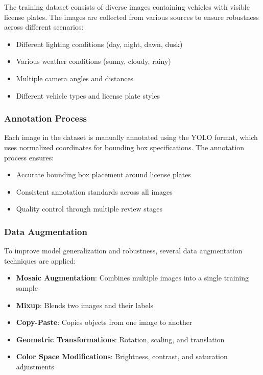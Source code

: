 \documentclass[12pt,a4paper]{article}
\begin{document}
The training dataset consists of diverse images containing vehicles with visible license plates. The images are collected from various sources to ensure robustness across different scenarios:

\begin{itemize}
    \item Different lighting conditions (day, night, dawn, dusk)
    \item Various weather conditions (sunny, cloudy, rainy)
    \item Multiple camera angles and distances
    \item Different vehicle types and license plate styles
\end{itemize}

\subsubsection{Annotation Process}

Each image in the dataset is manually annotated using the YOLO format, which uses normalized coordinates for bounding box specifications. The annotation process ensures:

\begin{itemize}
    \item Accurate bounding box placement around license plates
    \item Consistent annotation standards across all images
    \item Quality control through multiple review stages
\end{itemize}

\subsubsection{Data Augmentation}

To improve model generalization and robustness, several data augmentation techniques are applied:

\begin{itemize}
    \item \textbf{Mosaic Augmentation}: Combines multiple images into a single training sample
    \item \textbf{Mixup}: Blends two images and their labels
    \item \textbf{Copy-Paste}: Copies objects from one image to another
    \item \textbf{Geometric Transformations}: Rotation, scaling, and translation
    \item \textbf{Color Space Modifications}: Brightness, contrast, and saturation adjustments
\end{itemize}
\end{document}
